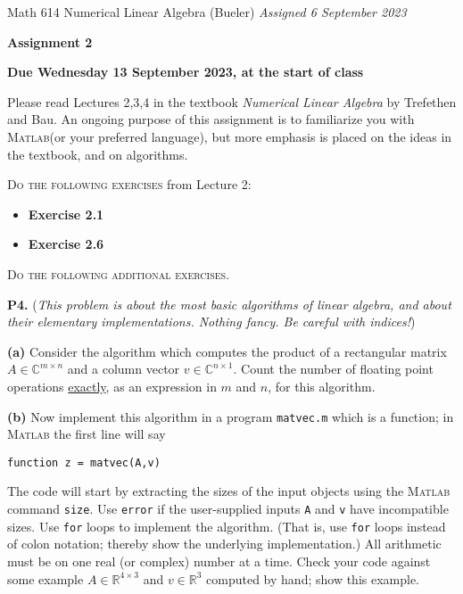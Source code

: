 \documentclass[12pt]{amsart}
\newcommand{\CC}{\mathbb{C}}
\newcommand{\RR}{\mathbb{R}}
\newcommand{\prob}[1]{\bigskip\noindent\textbf{#1.}\quad }
\newcommand{\epart}[1]{\medskip\noindent\textbf{(#1)}\quad }
\newcommand{\Matlab}{\textsc{Matlab}\xspace}
\begin{document}
\scriptsize \noindent Math 614 Numerical Linear Algebra (Bueler) \hfill \emph{Assigned 6 September 2023}
\normalsize\medskip

\Large\centerline{\textbf{Assignment 2}}
\large
\medskip

\centerline{\textbf{Due Wednesday 13 September 2023, at the start of class}}
\medskip
\normalsize

\thispagestyle{empty}

\bigskip
\noindent Please read Lectures 2,3,4 in the textbook \emph{Numerical Linear Algebra} by Trefethen and Bau.  An ongoing purpose of this assignment is to familiarize you with \Matlab (or your preferred language), but more emphasis is placed on the ideas in the textbook, and on algorithms.

\bigskip
\noindent \textsc{Do the following exercises} from Lecture 2:

\begin{itemize}
\item \textbf{Exercise 2.1}
\item \textbf{Exercise 2.6}
\end{itemize}


\bigskip
\noindent \textsc{Do the following additional exercises.}

\prob{P4}  (\emph{This problem is about the most basic algorithms of linear algebra, and about their elementary implementations.  Nothing fancy.  Be careful with indices!})

\epart{a}  Consider the algorithm which computes the product of a rectangular matrix $A\in \CC^{m\times n}$ and a column vector $v \in \CC^{n\times 1}$.  Count the number of floating point operations \underline{exactly}, as an expression in $m$ and $n$, for this algorithm.

\epart{b}  Now implement this algorithm in a program \texttt{matvec.m} which is a function; in \Matlab the first line will say

\texttt{function z = matvec(A,v)}

\noindent The code will start by extracting the sizes of the input objects using the \Matlab command \texttt{size}.  Use \texttt{error} if the user-supplied inputs \texttt{A} and \texttt{v} have incompatible sizes.  Use \texttt{for} loops to implement the algorithm.  (That is, use \texttt{for} loops instead of colon notation; thereby show the underlying implementation.)  All arithmetic must be on one real (or complex) number at a time.  Check your code against some example $A\in \RR^{4\times 3}$ and $v\in \RR^3$ computed by hand; show this example.
\end{document}
